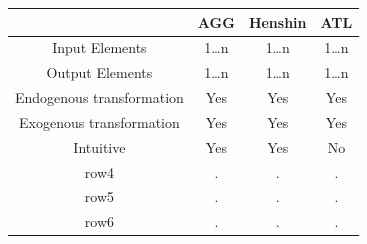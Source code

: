 \documentclass[pdftex,11pt,a4paper]{article}
\newcommand{\ra}{\rand0.\arabic{rand}}
\begin{document}
\begin{table}[ht]
\centering
\begin{tabular}{c | c | c | c |}
\hline
& AGG & Henshin & ATL \\
\hline
Input Elements& 1\ldots n & 1\ldots n & 1\ldots n\\
Output Elements & 1\ldots n & 1\ldots n & 1\ldots n\\
Endogenous transformation& \cellcolor{green!25}Yes & \cellcolor{green!25}Yes & \cellcolor{green!25}Yes \\
Exogenous transformation& \cellcolor{green!25}Yes & \cellcolor{green!25}Yes & \cellcolor{green!25}Yes \\
Intuitive& \cellcolor{green!25}Yes & \cellcolor{green!25}Yes
&\cellcolor{red!25}No  \\
row4& \ra & \ra & \ra \\
row5& \ra & \ra & \ra \\
row6& \ra & \ra & \ra \\
\hline
\end{tabular}
\end{table}

\pagebreak
 

\end{document}
